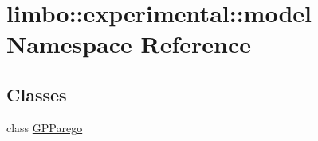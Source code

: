 \hypertarget{namespacelimbo_1_1experimental_1_1model}{}\section{limbo\+:\+:experimental\+:\+:model Namespace Reference}
\label{namespacelimbo_1_1experimental_1_1model}
\subsection*{Classes}
\begin{DoxyCompactItemize}
\item 
class \hyperlink{classlimbo_1_1experimental_1_1model_1_1_g_p_parego}{G\+P\+Parego}
\end{DoxyCompactItemize}
